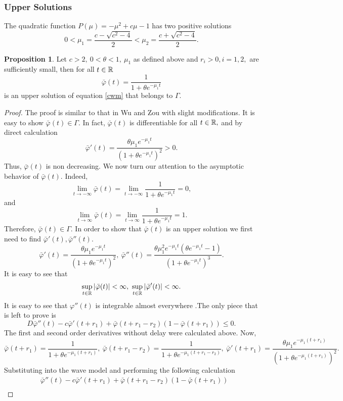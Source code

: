 \documentclass[12pt,letterpaper]{amsart}
\theoremstyle{definition}
\newtheorem{proposition}[theorem]{Proposition}
\theoremstyle{remark}
\numberwithin{equation}{section}
\begin{document}
\subsubsection{Upper Solutions}
The quadratic function $P(\mu)=-\mu^2+c\mu -1$ has two positive solutions 
\[0< \mu_1=\frac{c-\sqrt{c^2-4}}{2}<\mu_2=\frac{c+\sqrt{c^2-4}}{2}.\]
\begin{proposition}
Let $c>2, \ 0<\theta<1, \ \mu_1$ as defined above and $r_i>0, i=1,2,$ are sufficiently small, then for all $t\in \mathbb R$   
\[\bar{\varphi}(t)=\frac{1}{1+\theta e^{-\mu_1 t}}\] is an upper solution of equation \ref{cwm} that belongs to $\Gamma.$
\end{proposition}
\begin{proof}
The proof is similar to that in Wu and Zou \cite{wuzou} with slight modifications. It is easy to show $\bar{\varphi}(t)\in \Gamma.$ In fact, $\bar{\varphi}(t)$ is differentiable for all $t\in \mathbb R,$ and by direct calculation 
\[\bar{\varphi}'(t)=\frac{\theta \mu_1 e^{-\mu_1 t}}{(1+\theta e^{-\mu_1 t})^2}>0.\]
Thus, $\bar{\varphi}(t)$ is non decreasing. We now turn our attention to the asymptotic behavior of $\bar{\varphi}(t).$ Indeed, 
\[\lim_{t\to -\infty}\bar{\varphi}(t)=\lim_{t\to -\infty}\frac{1}{1+\theta e^{-\mu_1 t}}=0,\]
and 
\[\lim_{t\to \infty}\bar{\varphi}(t)=\lim_{t\to \infty}\frac{1}{1+\theta e^{-\mu_1 t}}=1.\]
Therefore, $\bar{\varphi}(t)\in \Gamma.$  In order to show that $\bar{\varphi}(t)$ is an upper solution we first need to find $\bar{\varphi}'(t), \bar{\varphi}''(t)$.  
\[\bar{\varphi}'(t)=\frac{\theta \mu_1e^{-\mu_1 t}}{\left(1+\theta e^{-\mu_1 t}\right)^2}, \ \bar{\varphi}''(t)=\frac{\theta \mu_1^2 e^{-\mu_1 t}\left(\theta e^{-\mu_1 t}-1\right)}{\left(1+\theta e^{-\mu_1 t}\right)^3}.\]
It is easy to see that
\[\sup_{t\in \mathbb R}|\bar{\varphi}(t)|<\infty, \ \sup_{t\in \mathbb R}|\bar{\varphi}'(t)|<\infty.\]
It is easy to see that $\varphi''(t)$ is integrable almost everywhere .The only piece that is left to prove is \[D\bar{\varphi}''(t)-c\bar{\varphi}'(t+r_1)+\bar{\varphi}(t+r_1-r_2)\left(1-\bar{\varphi}(t+r_1)\right)\le 0.\] 
The first and second order derivatives without delay were calculated above. Now, 
\[\bar{\varphi}(t+r_1)=\frac{1}{1+\theta e^{-\mu_1 (t+r_1)}}, \ \bar{\varphi}(t+r_1-r_2)=\frac{1}{1+\theta e^{-\mu_1 (t+r_1-r_2)}}, \  \bar{\varphi}'(t+r_1)= \frac{\theta \mu_1e^{-\mu_1 (t+r_1)}}{\left(1+\theta e^{-\mu_1 (t+r_1)}\right)^2}.\]
Substituting into the wave model and performing the following calculation
\begin{align*}
  &\bar{\varphi}''(t)-c\bar{\varphi}'(t+r_1)+\bar{\varphi}(t+r_1-r_2)\left(1-\bar{\varphi}(t+r_1)\right)\\

\end{align*}
\end{proof}
\end{document}

